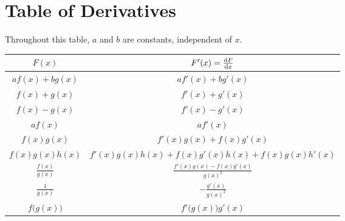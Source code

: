 
\chapter{Table of Derivatives}\label{app deriv}

Throughout this table, $a$ and $b$ are constants, independent of $x$.

\begin{center}

\renewcommand{\arraystretch}{2.5}
     \begin{tabular}{|c|c|}
        \hline
    $F(x)$ & $F'(x)=\diff{F}{x}$ \\ 
        \hline\hline
    $af(x)+bg(x)$ & $af'(x)+bg'(x)$ \\  \hline
    $f(x)+g(x)$ & $f'(x)+g'(x)$ \\  \hline
    $f(x)-g(x)$ & $f'(x)-g'(x)$ \\  \hline
    $af(x)$ & $af'(x)$ \\  \hline
    $f(x)g(x)$ & $f'(x)g(x)+f(x)g'(x)$ \\  \hline
    $f(x)g(x)h(x)$ &$f'(x)g(x)h(x)+f(x)g'(x)h(x)+f(x)g(x)h'(x)$ \\  \hline
    $\frac{f(x)}{g(x)}$ & $\frac{f'(x)g(x)-f(x)g'(x)}{g(x)^2}$ \\  \hline
    $\frac{1}{g(x)}$ & $-\frac{g'(x)}{g(x)^2}$ \\  \hline\hline
    $f\big(g(x)\big)$ & $f'\big(g(x)\big)g'(x)$ \\  \hline
     \end{tabular}


\end{center}
